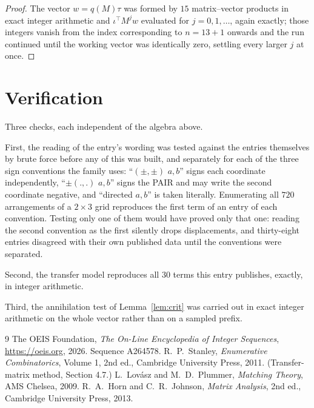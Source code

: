 \documentclass[11pt,a4paper]{article}
\theoremstyle{plain}
\theoremstyle{definition}
\begin{document}
\begin{proof}
The vector $w=q(M)\tau$ was formed by $15$ matrix--vector products in exact integer
arithmetic and $\iota^{\!\top}M^{j}w$ evaluated for $j=0,1,\dots$, again exactly; those
integers vanish from the index corresponding to $n=13+1$ onwards and the run continued
until the working vector was identically zero, settling every larger $j$ at once.
\end{proof}

\section{Verification}

Three checks, each independent of the algebra above.

First, the reading of the entry's wording was tested against the entries themselves by brute
force before any of this was built, and separately for each of the three sign conventions the
family uses: ``$(\pm,\pm)$ $a,b$'' signs each coordinate independently, ``$\pm(.,.)$ $a,b$''
signs the PAIR and may write the second coordinate negative, and ``directed $a,b$'' is taken
literally. Enumerating all $720$ arrangements of a $2\times3$ grid reproduces the first term
of an entry of each convention. Testing only one of them would have proved only that one:
reading the second convention as the first silently drops displacements, and thirty-eight
entries disagreed with their own published data until the conventions were separated.

Second, the transfer model reproduces all $30$ terms this entry publishes, exactly, in
integer arithmetic.

Third, the annihilation test of Lemma~\ref{lem:crit} was carried out in exact integer
arithmetic on the whole vector rather than on a sampled prefix.

\begin{thebibliography}{9}
 The OEIS Foundation, \emph{The On-Line Encyclopedia of Integer
Sequences}, \url{https://oeis.org}, 2026. Sequence A264578.
 R.~P.~Stanley, \emph{Enumerative Combinatorics}, Volume 1, 2nd ed.,
Cambridge University Press, 2011. (Transfer-matrix method, Section 4.7.)
 L.~Lov\'asz and M.~D.~Plummer, \emph{Matching Theory}, AMS Chelsea, 2009.
 R.~A.~Horn and C.~R.~Johnson, \emph{Matrix Analysis}, 2nd ed., Cambridge
University Press, 2013.
\end{thebibliography}
\end{document}
